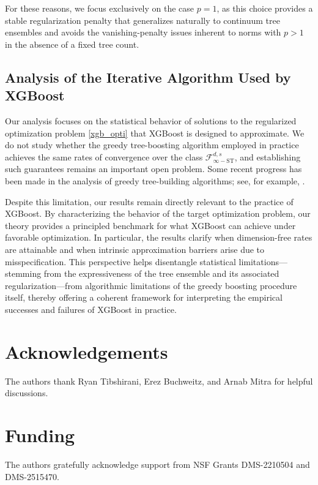 \documentclass[10pt]{article}
\newcommand{\fstinf}{{\mathcal{F}^{d, s}_{\infty-\text{ST}}}}
\begin{document}
For these reasons, we focus exclusively on the case $p = 1$, as this
choice provides a stable regularization penalty that generalizes
naturally to continuum tree ensembles and avoids the 
vanishing-penalty issues inherent to norms with $p > 1$ in the 
absence of a fixed tree count. 


\subsection{Analysis of the Iterative Algorithm Used by XGBoost}
\label{algo_open} 

Our analysis focuses on the statistical behavior of solutions to the
regularized optimization problem \eqref{xgb_opti} that XGBoost is 
designed to approximate. We do not study whether the greedy 
tree-boosting algorithm employed in practice achieves the same rates 
of convergence over the class $\fstinf$, and establishing such 
guarantees remains an important open problem. Some recent progress 
has been made in the analysis of greedy tree-building algorithms; 
see, for example, \citet{tan2024statistical}.

Despite this limitation, our results remain directly relevant to the
practice of XGBoost. By characterizing the behavior of the target
optimization problem, our theory provides a principled benchmark for
what XGBoost can achieve under favorable optimization. In particular,
the results clarify when dimension-free rates are attainable
and when intrinsic approximation barriers arise due to
misspecification. This perspective helps disentangle statistical
limitations—stemming from the expressiveness of the tree ensemble
and its associated regularization—from algorithmic limitations of
the greedy boosting procedure itself, thereby offering a coherent
framework for interpreting the empirical successes and failures of
XGBoost in practice. 



\section*{Acknowledgements}
The authors thank Ryan Tibshirani, Erez Buchweitz, 
and Arnab Mitra for helpful discussions.

\section*{Funding}
The authors gratefully acknowledge support from NSF Grants 
DMS-2210504 and DMS-2515470.
\end{document}
